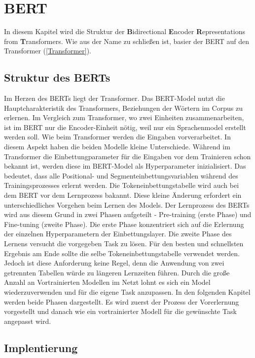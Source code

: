 \chapter{BERT}

In diesem Kapitel wird die Struktur der \textbf{B}idirectional \textbf{E}ncoder \textbf{R}epresentations from \textbf{T}ransformers. Wie aus der Name zu schließen ist, basier der BERT auf den Transformer (\ref{Transformer}).

\section{Struktur des BERTs} \label{BERT}

Im Herzen des BERTs liegt der Transformer. Das BERT-Model nutzt die Hauptcharakteristik des Transformers, Beziehungen der Wörtern im Corpus zu erlernen. Im Vergleich zum Transformer, wo zwei Einheiten zusammenarbeiten, ist im BERT nur die Encoder-Einheit nötig, weil nur ein Sprachenmodel erstellt werden soll. Wie beim Transformer werden die Eingaben vorverarbeitet. In diesem Aspekt haben die beiden Modelle kleine Unterschiede. Während im Transformer die Einbettungparameter  für die Eingaben vor dem Trainieren schon bekannt ist, werden diese im BERT-Model als Hyperparameter inizialisiert. Das bedeutet, dass alle Positional- und Segmenteinbettungsvariablen während des Trainingsprozesses erlernt werden. Die Tokeneinbettungstabelle wird auch bei dem BERT vor dem Lernprozess bakannt. Diese kleine Änderung erfordert ein unterschiedliches Vorgehen beim Lernen des Models. Der Lernprozess des BERTs wird aus diesem Grund in zwei Phasen aufgeteilt - Pre-training (erste Phase) und Fine-tuning (zweite Phase). Die erste Phase konzentriert sich auf die Erlernung der einzelnen Hyperparametern der Einbettungslayer. Die zweite Phase des Lernens versucht die vorgegeben Task zu lösen. Für den besten und schnellsten Ergebnis am Ende sollte die selbe Tokeneinbettungstabelle verwendet werden. Jedoch ist diese Anforderung keine Regel, denn die Anwendung von zwei getrennten Tabellen würde zu längeren Lernzeiten führen. Durch die große Anzahl an Vortrainierten Modellen im Netzt lohnt es sich ein Model wiederzuverwenden und für die eigene Task anzupassen. In den folgenden Kapitel werden beide Phasen dargestellt. Es wird zuerst der Prozess der Vorerlernung vorgestellt und danach wie ein vortrainierter Modell für die gewünschte Task angepasst wird.

\section{Implentierung}

